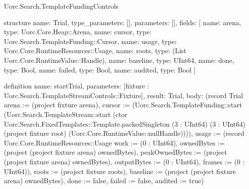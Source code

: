 \begin{lexlean}{Uorc.Search.TemplateFundingControls}
\begin{semanticmodule}
structure{
  name: Trial,
  type_parameters: [],
  parameters: [],
  fields: [
    {name: arena, type: Uorc.Core.Heap::Arena},
    {name: cursor, type: Uorc.Search.TemplateFunding::Cursor},
    {name: usage, type: Uorc.Core.RuntimeResources::Usage},
    {name: roots, type: (List Uorc.Core.RuntimeValue::Handle)},
    {name: baseline, type: UInt64},
    {name: done, type: Bool},
    {name: failed, type: Bool},
    {name: audited, type: Bool}
  ]
}

definition{
  name: startTrial,
  parameters: [fixture : Uorc.Search.TemplateStreamControls::Fixture],
  result: Trial,
  body: (record Trial {arena := (project fixture arena), cursor := (Uorc.Search.TemplateFunding::start (Uorc.Search.TemplateStream::start (ctor Uorc.Search.FixedTemplates::Template.packedSingleton (3 : UInt64) (3 : UInt64) (project fixture root) (Uorc.Core.RuntimeValue::nullHandle)))), usage := (record Uorc.Core.RuntimeResources::Usage {work := (0 : UInt64), ownedBytes := (project (project fixture arena) ownedBytes), peakOwnedBytes := (project (project fixture arena) ownedBytes), outputBytes := (0 : UInt64), frames := (0 : UInt64)}), roots := (project fixture roots), baseline := (project (project fixture arena) ownedBytes), done := false, failed := false, audited := true})
}


\end{semanticmodule}
\end{lexlean}
